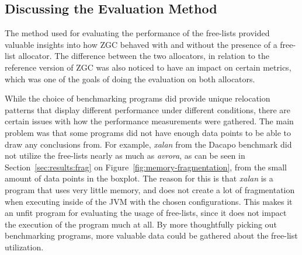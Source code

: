 \subsection{Discussing the Evaluation Method}
The method used for evaluating the performance of the free-lists provided valuable insights into how ZGC behaved with and without the presence of a free-list allocator. The difference between the two allocators, in relation to the reference version of ZGC was also noticed to have an impact on certain metrics, which was one of the goals of doing the evaluation on both allocators.

While the choice of benchmarking programs did provide unique relocation patterns that display different performance under different conditions, there are certain issues with how the performance measurements were gathered. The main problem was that some programs did not have enough data points to be able to draw any conclusions from. For example, \textit{xalan} from the Dacapo benchmark did not utilize the free-lists nearly as much as \textit{avrora}, as can be seen in Section~\ref{sec:results:frag} on Figure~\ref{fig:memory-fragmentation}, from the small amount of data points in the boxplot. The reason for this is that \textit{xalan} is a program that uses very little memory, and does not create a lot of fragmentation when executing inside of the JVM with the chosen configurations. This makes it an unfit program for evaluating the usage of free-lists, since it does not impact the execution of the program much at all. By more thoughtfully picking out benchmarking programs, more valuable data could be gathered about the free-list utilization.

